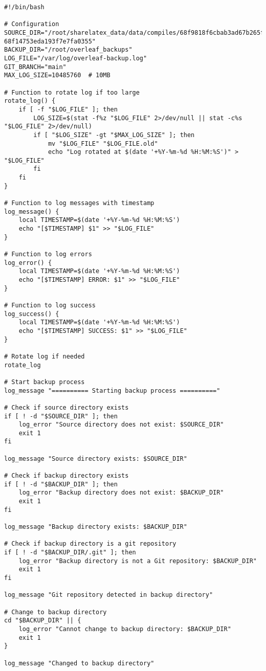 \begin{verbatim}
#!/bin/bash

# Configuration
SOURCE_DIR="/root/sharelatex_data/data/compiles/68f9818f6cbab3ad67b265f7-68f14753eda193f7e7fa0355"
BACKUP_DIR="/root/overleaf_backups"
LOG_FILE="/var/log/overleaf-backup.log"
GIT_BRANCH="main"
MAX_LOG_SIZE=10485760  # 10MB

# Function to rotate log if too large
rotate_log() {
    if [ -f "$LOG_FILE" ]; then
        LOG_SIZE=$(stat -f%z "$LOG_FILE" 2>/dev/null || stat -c%s "$LOG_FILE" 2>/dev/null)
        if [ "$LOG_SIZE" -gt "$MAX_LOG_SIZE" ]; then
            mv "$LOG_FILE" "$LOG_FILE.old"
            echo "Log rotated at $(date '+%Y-%m-%d %H:%M:%S')" > "$LOG_FILE"
        fi
    fi
}

# Function to log messages with timestamp
log_message() {
    local TIMESTAMP=$(date '+%Y-%m-%d %H:%M:%S')
    echo "[$TIMESTAMP] $1" >> "$LOG_FILE"
}

# Function to log errors
log_error() {
    local TIMESTAMP=$(date '+%Y-%m-%d %H:%M:%S')
    echo "[$TIMESTAMP] ERROR: $1" >> "$LOG_FILE"
}

# Function to log success
log_success() {
    local TIMESTAMP=$(date '+%Y-%m-%d %H:%M:%S')
    echo "[$TIMESTAMP] SUCCESS: $1" >> "$LOG_FILE"
}

# Rotate log if needed
rotate_log

# Start backup process
log_message "========== Starting backup process =========="

# Check if source directory exists
if [ ! -d "$SOURCE_DIR" ]; then
    log_error "Source directory does not exist: $SOURCE_DIR"
    exit 1
fi

log_message "Source directory exists: $SOURCE_DIR"

# Check if backup directory exists
if [ ! -d "$BACKUP_DIR" ]; then
    log_error "Backup directory does not exist: $BACKUP_DIR"
    exit 1
fi

log_message "Backup directory exists: $BACKUP_DIR"

# Check if backup directory is a git repository
if [ ! -d "$BACKUP_DIR/.git" ]; then
    log_error "Backup directory is not a Git repository: $BACKUP_DIR"
    exit 1
fi

log_message "Git repository detected in backup directory"

# Change to backup directory
cd "$BACKUP_DIR" || {
    log_error "Cannot change to backup directory: $BACKUP_DIR"
    exit 1
}

log_message "Changed to backup directory"


\end{verbatim}
